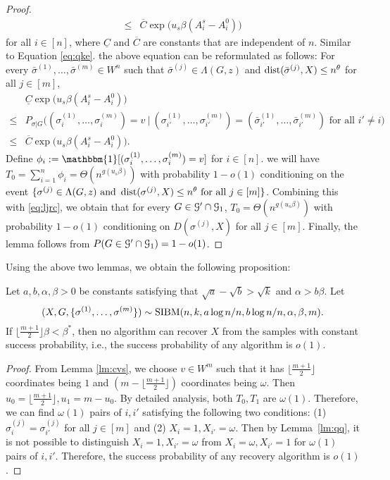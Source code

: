 \documentclass{article}
\begin{document}
\begin{proof}
\begin{align*}
	\le & \overline{C}
	\exp\big(u_s \beta (A^s_i-A^0_i) \big)
	\end{align*}
	for all $i\in[n]$, where $\underline{C}$ and $\overline{C}$ are constants that are independent of $n$.
	Similar to Equation \eqref{eq:qke}. the above equation can be reformulated as follows:
	For every $\bar{\sigma}^{(1)},\dots,\bar{\sigma}^{(m)}\in W^n$ such that $\bar{\sigma}^{(j)}\in  \Lambda(G, z)$
	and $\operatorname{dist}(\bar{\sigma}^{(j)}, X) \le n^\theta$
	for all $j\in[m]$,
	\begin{equation} \label{eq:s56}
	\begin{aligned}
	& \underline{C}
	\exp\big( u_s  \beta (A^s_i-A^0_i) \big) \\
	\le
	& P_{\sigma|G} \big( (\sigma_i^{(1)},\dots,\sigma_i^{(m)})=v ~\big|~ (\sigma_{i'}^{(1)},\dots,\sigma_{i'}^{(m)})= (\bar{\sigma}_{i'}^{(1)},\dots,\bar{\sigma}_{i'}^{(m)}) \text{~for all~} i'\neq i \big) \\
	\le & \overline{C}
	\exp\big(u_s  \beta (A^s_i-A^0_i) \big).
	\end{aligned}
	\end{equation}
	Define 
	$\phi_i := \mathbbm{1}[(\sigma_i^{(1)},\dots,\sigma_i^{(m)})=v]$ for $i\in[n]$.
	we will have $T_0=\sum_{i=1}^n \phi_i=\Theta(n^{g(u_s\beta)})$ with probability $1-o(1)$ conditioning on the event $\{\sigma^{(j)}\in  \Lambda(G, z)
	\text{~and~} \operatorname{dist}(\sigma^{(j)}, X) \le n^\theta
	\text{~for all~} j\in[m]\}$. Combining this with \eqref{eq:ljrc}, we obtain that for every $G\in\mathcal{G}'\cap\mathcal{G}_{1}$,
	$T_0=\Theta( n^{g(u_s\beta)})$ with probability $1-o(1)$ conditioning on $D(\sigma^{(j)}, X)$ for all $j\in[m]$.
	Finally, the lemma follows from $P(G\in\mathcal{G}'\cap\mathcal{G}_{1})=1-o(1)$.
\end{proof}
Using the above two lemmas, we obtain the following proposition:
\begin{proposition}
	Let $a,b,\alpha,\beta> 0$ be constants satisfying that $\sqrt{a}-\sqrt{b} > \sqrt{k}$ and $\alpha>b\beta$. 
	Let 
	$$
	(X,G,\{\sigma^{(1)},\dots,\sigma^{(m)}\})\sim \operatorname{SIBM}(n,k,a\log n/n, b\log n/n,\alpha,\beta, m) .
	$$
	If $\lfloor\frac{m+1}{2} \rfloor \beta<\beta^\ast$, then no algorithm can recover $X$ from the samples with constant success probability, i.e., the success probability of any algorithm is $o(1)$.
\end{proposition}
\begin{proof}
	From Lemma \ref{lm:cvs}, we choose $v \in W^m$ such that it has $\lfloor \frac{m+1}{2} \rfloor$ coordinates being $1$
	and $(m-\lfloor \frac{m+1}{2} \rfloor)$ coordinates being $\omega$.
	Then $u_0 = \lfloor \frac{m+1}{2} \rfloor, u_1 = m - u_0$.
	By detailed analysis, both $T_0, T_1$ are $\omega(1)$.
	Therefore, we can find $\omega(1)$ pairs of $i, i'$ satisfying the following two conditions: (1) $\sigma_{i}^{(j)}=\sigma_{i'}^{(j)}$ for all $j\in[m]$ and
	(2) $X_i = 1, X_{i'} = \omega$.
	Then by Lemma~\ref{lm:qq}, it is not possible to distinguish $X_i = 1, X_{i'} = \omega$ from $X_i = \omega, X_{i'} = 1$
	for $\omega(1)$ pairs of $i, i'$.
	Therefore, the success probability of any recovery algorithm is $o(1)$.
\end{proof}
\appendix
\end{document}
